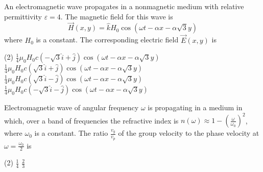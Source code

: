 \begin{enumerate}
\begin{minipage}{\textwidth}
	\item An electromagnetic wave propagates in a nonmagnetic medium with relative permittivity $\varepsilon=4$. The magnetic field for this wave is
	$$
	\vec{H}(x, y)=\hat{k} H_{0} \cos (\omega t-\alpha x-\alpha \sqrt{3} y)
	$$
	where $H_{0}$ is a constant. The corresponding electric field $\vec{E}(x, y)$ is
\end{minipage}
\begin{tasks}(2)
	\task[\textbf{A.}] $\frac{1}{4} \mu_{0} H_{0} c(-\sqrt{3} \hat{i}+\hat{j}) \cos (\omega t-\alpha x-\alpha \sqrt{3} y)$ 
	\task[\textbf{B.}] $\frac{1}{4} \mu_{0} H_{0} c(\sqrt{3} \hat{i}+\hat{j}) \cos (\omega t-\alpha x-\alpha \sqrt{3} y)$
	\task[\textbf{C.}]$\frac{1}{4} \mu_{0} H_{0} c(\sqrt{3} \hat{i}-\hat{j}) \cos (\omega t-\alpha x-\alpha \sqrt{3} y)$
	\task[\textbf{D.}]$\frac{1}{4} \mu_{0} H_{0} c(-\sqrt{3} \hat{i}-\hat{j}) \cos (\omega t-\alpha x-\alpha \sqrt{3} y)$
\end{tasks}
\begin{minipage}{\textwidth}
	\item Electromagnetic wave of angular frequency $\omega$ is propagating in a medium in which, over a band of frequencies the refractive index is $n(\omega) \approx 1-\left(\frac{\omega}{\omega_{0}}\right)^{2}$, where $\omega_{0}$ is a constant. The ratio $\frac{v_{g}}{v_{p}}$ of the group velocity to the phase velocity at $\omega=\frac{\omega_{0}}{2}$ is
\end{minipage}
\begin{tasks}(2)
	\task[\textbf{B.}]$\frac{1}{4}$
	\task[\textbf{C.}]$\frac{2}{3}$
\end{tasks}

\end{enumerate}


